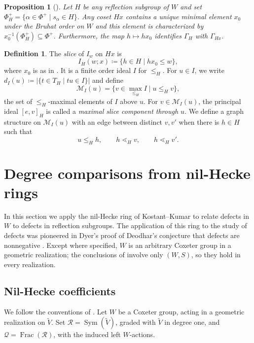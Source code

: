 \documentclass[11pt]{amsart}
\newtheorem{proposition}[proposition]{Proposition}
\theoremstyle{definition}
\newtheorem{definition}[definition]{Definition}
\theoremstyle{remark}
\numberwithin{equation}{section}
\DeclareMathOperator{\Sym}{Sym}
\DeclareMathOperator{\Frac}{Frac}
\begin{document}
\begin{proposition}[\cite{DyerThesis,DyerGraph}]
\label{prop:Dyer-bg}
Let $H$ be any reflection subgroup of $W$ and set
$\Phi_H^+=\{\alpha\in\Phi^+ \mid s_\alpha\in H\}$. Any coset $Hx$ contains a unique minimal element $x_0$ under the Bruhat order on $W$ and this element is characterized by $x_0^{-1}(\Phi_H^+)\subseteq\Phi^+$. Furthermore, the map $h\mapsto hx_0$
identifies $\Gamma_H$ with $\Gamma_{Hx}$.
\end{proposition}

\begin{definition}\label{def:slice}
The \emph{slice} of $I_w$ on $Hx$ is
\[
I_H(w;x)\coloneqq \{h\in H \mid hx_0\le w\},
\]
where $x_0$ is as in . It is a finite order ideal $I$ for $\le_H$. For $u \in I$, we write
$d_I(u) \coloneqq \lvert\{t\in T_H \mid tu\in I\}\rvert$ and define
\[
 \mathcal M_I(u)=
 \{v\in\max_{\le_H}I \mid u\le_Hv\},
\]
the set of $\leq_H$-maximal elements of $I$ above $u$. For $v\in\mathcal M_I(u)$, the principal ideal $[e,v]_H$ is called
a \emph{maximal slice component through $u$}. We define a graph structure on $\mathcal M_I(u)$ with an edge between
distinct $v,v'$ when there is $h\in H$ such that
\[
 u\le_Hh,\qquad h\lessdot_Hv,\qquad h\lessdot_Hv'.
\]
\end{definition}

\section{Degree comparisons from nil-Hecke rings}\label{sec:degree-comparison}

In this section we apply the nil-Hecke ring of Kostant--Kumar
\cite{KostantKumar-86-nilhecke} to relate defects in $W$ to defects
in reflection subgroups. The application of this ring to the study of defects was pioneered in Dyer's proof of Deodhar's conjecture that defects are nonnegative \cite{DyerDeodhar}. Except where specified, $W$ is an arbitrary Coxeter group in a geometric realization; the conclusions of  involve only $(W,S)$, so they hold in every realization.

\subsection{Nil-Hecke coefficients}
We follow the conventions of \cite[\S2]{DyerDeodhar}. Let $W$ be a Coxeter group, acting in a geometric realization on $\tilde{V}$. Set $\mathcal{R}=\Sym(\tilde{V})$, graded with $\tilde{V}$ in degree one, and
$\mathcal{Q}=\Frac(\mathcal{R})$, with the induced left $W$-actions.
\end{document}
